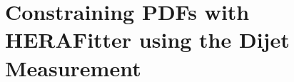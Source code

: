 \section{Constraining PDFs with HERAFitter using the Dijet Measurement}
\label{section:cmsjets2011_pdfconstraints}

%

